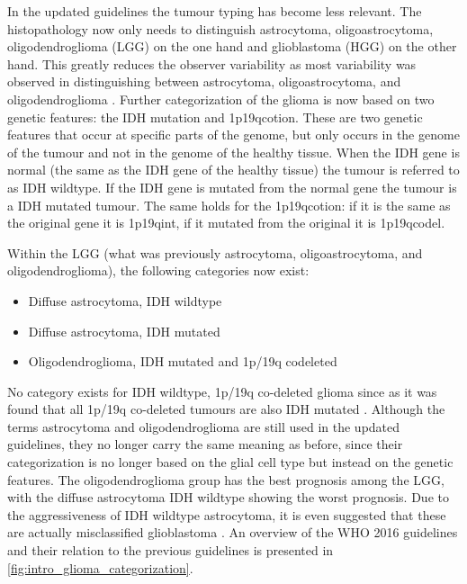 In the updated guidelines the tumour typing has become less relevant.
The histopathology now only needs to distinguish astrocytoma, oligoastrocytoma, oligodendroglioma (\gls{LGG}) on the one hand and glioblastoma (\gls{HGG}) on the other hand.
This greatly reduces the observer variability as most variability was observed in distinguishing between astrocytoma, oligoastrocytoma, and oligodendroglioma \autocite{mittler1996gradingreliability}.
Further categorization of the glioma is now based on two genetic features:  the \gls{IDH} mutation and \acl{1p19qcotion}.
These are two genetic features that occur at specific parts of the genome, but only occurs in the genome of the tumour and not in the genome of the healthy tissue.
When the \gls{IDH} gene is normal (the same as the \gls{IDH} gene of the healthy tissue) the tumour is referred to as \gls{IDH} wildtype.
If the \gls{IDH} gene is mutated from the normal gene the tumour is a \gls{IDH} mutated tumour.
The same holds for the \acl{1p19qcotion}: if it is the same as the original gene it is \acl{1p19qint}, if it mutated from the original it is \acl{1p19qcodel}.

Within the \gls{LGG} (what was previously astrocytoma, oligoastrocytoma, and oligodendroglioma), the following categories now exist:
\begin{itemize}
    \item Diffuse astrocytoma, \gls{IDH} wildtype
    \item Diffuse astrocytoma, \gls{IDH} mutated
    \item Oligodendroglioma, \gls{IDH} mutated and 1p/19q codeleted
\end{itemize}
No category exists for \gls{IDH} wildtype, 1p/19q co-deleted glioma since as it was found that all 1p/19q co-deleted tumours are also IDH mutated \autocite{labussi20101p19qcodeletedIDH}.
Although the terms astrocytoma and oligodendroglioma are still used in the updated guidelines, they no longer carry the same meaning as before, since their categorization is no longer based on the glial cell type but instead on the genetic features.
The oligodendroglioma group has the best prognosis among the \gls{LGG}, with the diffuse astrocytoma IDH wildtype showing the worst prognosis.
Due to the aggressiveness of IDH wildtype astrocytoma, it is even suggested that these are actually misclassified glioblastoma \autocite{hartmann2010IDH1gbm, brat2018IMPACT}.
An overview of the \gls{WHO} 2016 guidelines and their relation to the previous guidelines is presented in \cref{fig:intro_glioma_categorization}.


